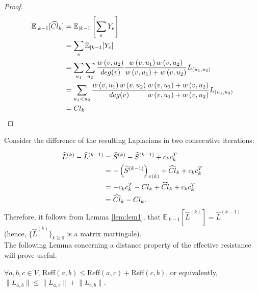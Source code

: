 \documentclass[11pt]{article}
\newcommand{\CExp}[1]{\mathbb{E}_{|#1}}
\begin{document}
\begin{proof}
\begin{align*}
\CExp{k-1}[\widehat{Cl}_{k}] &= \CExp{k-1}\left[\sum_{e}Y_{e}\right] \\
&= \sum_{e}\CExp{k-1}[Y_{e}] \\
&= \sum_{u_{1}}\sum_{u_{2}}\frac{w\paren{v,u_{2}}}{deg(v)}\frac{w\paren{v,u_{1}}w\paren{v,u_{2}}}{w\paren{v,u_{1}} + w\paren{v,u_{2}}}L_{\paren{u_{1},u_{2}}} \\
&= \sum_{u_{1}<u_{2}}\frac{w\paren{v,u_{1}}w\paren{v,u_{2}}}{deg(v)}\frac{w\paren{v,u_{1}}+w\paren{v,u_{2}}}{w\paren{v,u_{1}} + w\paren{v,u_{2}}}L_{\paren{u_{1},u_{2}}} \\
&= Cl_{k}
\end{align*}
\end{proof} 

Consider the difference of the resulting Laplacians in two consecutive iterations:

\begin{align*}
\widehat{L}^{(k)} - \widehat{L}^{(k-1)} &= \widehat{S}^{(k)} - \widehat{S}^{(k-1)} + c_{k}c_{k}^{T} \\
&= -\paren{\widehat{S}^{(k-1)}}_{\pi(k)} + \widehat{Cl}_{k} + c_{k}c_{k}^{T} \\
&= -c_{k}c_{k}^{T} - Cl_{k} + \widehat{Cl}_{k} + c_{k}c_{k}^{T} \\
&=  \widehat{Cl}_{k} - Cl_{k}.
\end{align*}
Therefore, it follows from Lemma \ref{lem:lem1}, that $ \CExp{k-1}\left[\widehat{L}^{(k)}\right] = \widehat{L}^{(k-1)} $ (hence, $ \{\widehat{L}^{(k)}\}_{k \geq 0} $ is a matrix martingale). \\

The following Lemma concerning a distance property of the effective resistance will prove useful.
\begin{lemma}\label{lem:lem2}
	$ \forall a,b,c \in V $, $ \textrm{Reff}(a,b) \leq \textrm{Reff}(a,c) + \textrm{Reff}(c,b) $, or equivalently, $ \lVert \bar{L}_{a,b} \rVert \leq \lVert \bar{L}_{a,c} \rVert + \lVert \bar{L}_{c,b} \rVert$.
\end{lemma}
\end{document}
